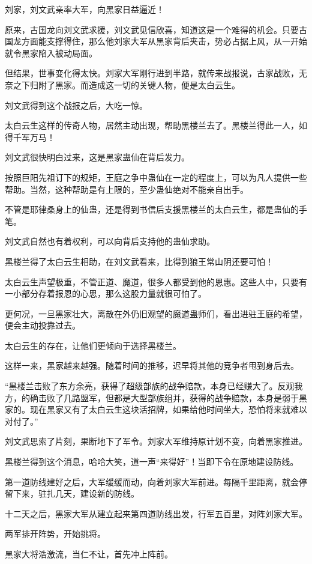 \begin{this_body}
刘家，刘文武亲率大军，向黑家日益逼近！

原来，古国龙向刘文武求援，刘文武见信欣喜，知道这是一个难得的机会。只要古国龙方面能支撑得住，那么他刘家大军从黑家背后夹击，势必占据上风，从一开始就令黑家陷入被动局面。

但结果，世事变化得太快。刘家大军刚行进到半路，就传来战报说，古家战败，无奈之下归附了黑家。而造成这一切的关键人物，便是太白云生。

刘文武得到这个战报之后，大吃一惊。

太白云生这样的传奇人物，居然主动出现，帮助黑楼兰去了。黑楼兰得此一人，如得千军万马！

刘文武很快明白过来，这是黑家蛊仙在背后发力。

按照巨阳先祖订下的规矩，王庭之争中蛊仙在一定的程度上，可以为凡人提供一些帮助。当然，这种帮助是有上限的，至少蛊仙绝对不能亲自出手。

不管是耶律桑身上的仙蛊，还是得到书信后支援黑楼兰的太白云生，都是蛊仙的手笔。

刘文武自然也有着权利，可以向背后支持他的蛊仙求助。

黑楼兰得了太白云生相助，在刘文武看来，比得到狼王常山阴还要可怕！

太白云生声望极重，不管正道、魔道，很多人都受到他的恩惠。这些人中，只要有一小部分存着报恩的心思，那么这股力量就很可怕了。

更何况，一旦黑家壮大，离散在外仍旧观望的魔道蛊师们，看出进驻王庭的希望，便会主动投靠过去。

太白云生的存在，让他们更倾向于选择黑楼兰。

这样一来，黑家越来越强。随着时间的推移，迟早将其他的竞争者甩到身后去。

“黑楼兰击败了东方余亮，获得了超级部族的战争赔款，本身已经赚大了。反观我方，的确击败了几路盟军，但都是大型部族组并，获得的战争赔款，本身是弱于黑家的。现在黑家又有了太白云生这块活招牌，如果给他时间坐大，恐怕将来就难以对付了。”

刘文武思索了片刻，果断地下了军令。刘家大军维持原计划不变，向着黑家推进。

黑楼兰得到这个消息，哈哈大笑，道一声“来得好”！当即下令在原地建设防线。

第一道防线建好之后，大军缓缓而动，向着刘家大军前进。每隔千里距离，就会停留下来，驻扎几天，建设新的防线。

十二天之后，黑家大军从建立起来第四道防线出发，行军五百里，对阵刘家大军。

两军排开阵势，开始挑将。

黑家大将浩激流，当仁不让，首先冲上阵前。


\end{this_body}
